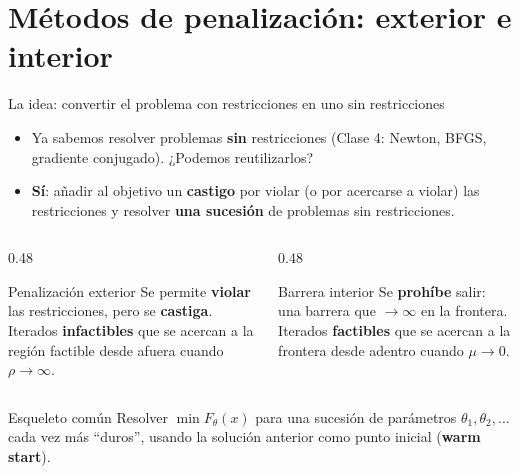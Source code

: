 \documentclass[aspectratio=169]{beamer}
\begin{document}
\section{Métodos de penalización: exterior e interior}

\begin{frame}{La idea: convertir el problema con restricciones en uno sin restricciones}
  \begin{itemize}
    \item Ya sabemos resolver problemas \textbf{sin} restricciones (Clase 4: Newton, BFGS, gradiente conjugado). ¿Podemos reutilizarlos?
    \item \textbf{Sí}: añadir al objetivo un \textbf{castigo} por violar (o por acercarse a violar) las restricciones y resolver \textbf{una sucesión} de problemas sin restricciones.
  \end{itemize}
  \begin{columns}[T]
    \begin{column}{0.48\textwidth}
      \begin{block}{Penalización exterior}
        Se permite \textbf{violar} las restricciones, pero se \textbf{castiga}. Iterados \textbf{infactibles} que se acercan a la región factible desde afuera cuando $\rho\to\infty$.
      \end{block}
    \end{column}
    \begin{column}{0.48\textwidth}
      \begin{block}{Barrera interior}
        Se \textbf{prohíbe} salir: una barrera que $\to\infty$ en la frontera. Iterados \textbf{factibles} que se acercan a la frontera desde adentro cuando $\mu\to0$.
      \end{block}
    \end{column}
  \end{columns}
  \begin{alertblock}{Esqueleto común}
    Resolver $\min F_\theta(x)$ para una sucesión de parámetros $\theta_1,\theta_2,\dots$ cada vez más ``duros'', usando la solución anterior como punto inicial (\textbf{warm start}).
  \end{alertblock}
\end{frame}
\end{document}
